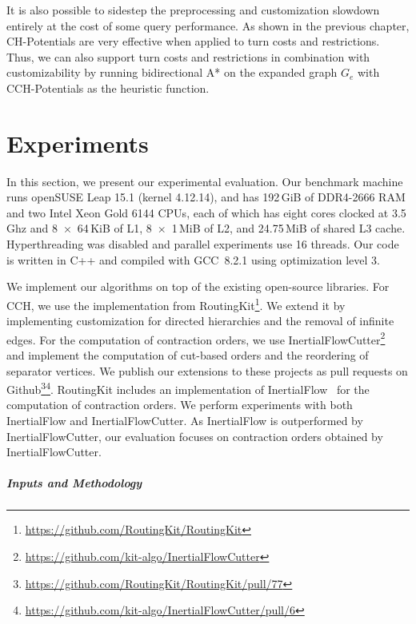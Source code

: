 \documentclass[a4paper, english, cleveref]{lipics-v2021}
\begin{document}
It is also possible to sidestep the preprocessing and customization slowdown entirely at the cost of some query performance.
As shown in the previous chapter, CH-Potentials are very effective when applied to turn costs and restrictions.
Thus, we can also support turn costs and restrictions in combination with customizability by running bidirectional A* on the expanded graph $G_e$ with CCH-Potentials as the heuristic function.

\section{Experiments}
\label{sec:experiments}

In this section, we present our experimental evaluation.
Our benchmark machine runs openSUSE Leap 15.1 (kernel 4.12.14), and has 192\,GiB of DDR4-2666 RAM and two Intel Xeon Gold 6144 CPUs, each of which has eight cores clocked at 3.5\,Ghz and 8~$\times$~64\,KiB of L1, 8~$\times$~1\,MiB of L2, and 24.75\,MiB of shared L3 cache.
Hyperthreading was disabled and parallel experiments use 16 threads.
Our code is written in C++ and compiled with GCC~8.2.1 using optimization level 3.

We implement our algorithms on top of the existing open-source libraries.
For CCH, we use the implementation from RoutingKit\footnote{\url{https://github.com/RoutingKit/RoutingKit}}.
We extend it by implementing customization for directed hierarchies and the removal of infinite edges.
For the computation of contraction orders, we use InertialFlowCutter\footnote{\url{https://github.com/kit-algo/InertialFlowCutter}}~\cite{GottesburenHUW19} and implement the computation of cut-based orders and the reordering of separator vertices.
We publish our extensions to these projects as pull requests on Github\footnote{\url{https://github.com/RoutingKit/RoutingKit/pull/77}}\footnote{\url{https://github.com/kit-algo/InertialFlowCutter/pull/6}}.
RoutingKit includes an implementation of InertialFlow~\cite{SchildS15} for the computation of contraction orders.
We perform experiments with both InertialFlow and InertialFlowCutter.
As InertialFlow is outperformed by InertialFlowCutter, our evaluation focuses on contraction orders obtained by InertialFlowCutter.

\subparagraph{Inputs and Methodology}
\end{document}
